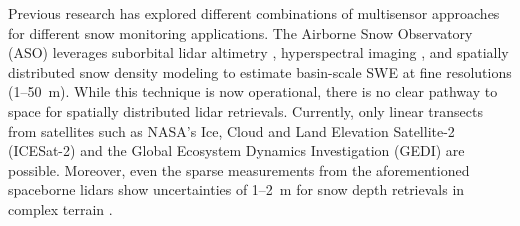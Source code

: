 Previous research has explored different combinations of multisensor approaches for different snow monitoring applications. The Airborne Snow Observatory (ASO) \citep{painterAirborneSnowObservatory2016} leverages suborbital lidar altimetry \citep{deemsLidarMeasurementSnow2013}, hyperspectral imaging \citep{nolinMappingAlpineSnow1993}, and spatially distributed snow density modeling \citep{marksSpatiallyDistributedEnergy1999,hedrickDirectInsertionNASA2018,meyerOperationalWaterForecast2023a} to estimate basin-scale SWE at fine resolutions (1--50~m). While this technique is now operational, there is no clear pathway to space for spatially distributed lidar retrievals. Currently, only linear transects from satellites such as NASA's Ice, Cloud and Land Elevation Satellite-2 (ICESat-2) \citep{abdalatiICESat2LaserAltimetry2010} and the Global Ecosystem Dynamics Investigation (GEDI) \citep{dubayahGlobalEcosystemDynamics2020} are possible. Moreover, even the sparse measurements from the aforementioned spaceborne lidars show uncertainties of 1--2~m for snow depth retrievals in complex terrain \citep{enderlinUncertaintyICESat2ATL062022, deschamps-bergerEvaluationSnowDepth2022}. 




